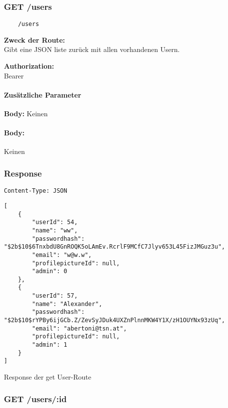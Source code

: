 \label{/users}

\subsubsection{GET /users}

\begin{lstlisting}
    /users
\end{lstlisting}

\textbf{Zweck der Route:} \\
Gibt  eine JSON liste zurück mit allen vorhandenen Usern.

\textbf{Authorization:} \\
Bearer

\paragraph{Zusätzliche Parameter}

\textbf{Body:}
Keinen

\paragraph{Body:}

Keinen

\newpage

\subsubsection{Response}

\begin{code}[h]
    \lstinline{Content-Type: JSON}
    \begin{lstlisting}
[
    {
        "userId": 54,
        "name": "ww",
        "passwordhash": "$2b$10$6TnxbdU8GnROQK5oLAmEv.RcrlF9MCfC7Jlyv653L45FizJMGuz3u",
        "email": "w@w.w",
        "profilepictureId": null,
        "admin": 0
    },
    {
        "userId": 57,
        "name": "Alexander",
        "passwordhash": "$2b$10$rYPBy6ijGCb.Z/ZevSyJDuk4UXZnPlnnMKW4Y1X/zH1OUYNx93zUq",
        "email": "abertoni@tsn.at",
        "profilepictureId": null,
        "admin": 1
    }
]
\end{lstlisting}
    \caption{Response der get User-Route}
\end{code}



\pagebreak

\subsubsection{GET /users/:id}

